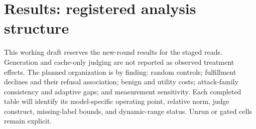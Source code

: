 \section{Results: registered analysis structure}
\label{sec:results}
This working draft reserves the new-round results for the staged reads. Generation and cache-only judging are not reported as observed treatment effects. The planned organization is by finding: random controls; fulfillment declines and their refusal association; benign and utility costs; attack-family consistency and adaptive gaps; and measurement sensitivity. Each completed table will identify its model-specific operating point, relative norm, judge construct, missing-label bounds, and dynamic-range status. Unrun or gated cells remain explicit.

